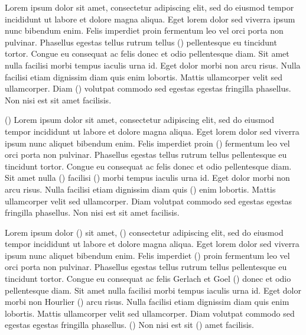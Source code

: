 \documentclass[
]{article}
\begin{document}
Lorem ipsum dolor sit amet, consectetur adipiscing elit, sed do eiusmod
tempor incididunt ut labore et dolore magna aliqua. Eget lorem dolor sed
viverra ipsum nunc bibendum enim. Felis imperdiet proin fermentum leo
vel orci porta non pulvinar. Phasellus egestas tellus rutrum tellus
() pellentesque eu tincidunt tortor. Congue eu consequat ac felis
donec et odio pellentesque diam. Sit amet nulla facilisi morbi tempus
iaculis urna id. Eget dolor morbi non arcu risus. Nulla facilisi etiam
dignissim diam quis enim lobortis. Mattis ullamcorper velit sed
ullamcorper. Diam () volutpat commodo sed egestas egestas fringilla phasellus.
Non nisi est sit amet facilisis.

() Lorem ipsum dolor sit amet, consectetur adipiscing elit,
sed do eiusmod tempor incididunt ut labore et dolore magna aliqua. Eget
lorem dolor sed viverra ipsum nunc aliquet bibendum enim. Felis
imperdiet proin
() fermentum leo vel orci porta non pulvinar. Phasellus
egestas tellus rutrum tellus pellentesque eu tincidunt tortor. Congue eu
consequat ac felis donec et odio pellentesque diam. Sit amet nulla
() facilisi ()
morbi tempus iaculis urna id. Eget dolor morbi non arcu risus. Nulla
facilisi etiam dignissim diam quis
()
enim lobortis. Mattis ullamcorper velit sed ullamcorper. Diam volutpat
commodo sed egestas egestas fringilla phasellus. Non nisi est sit amet
facilisis.

Lorem ipsum dolor
() sit amet,
()
consectetur adipiscing elit, sed do eiusmod tempor incididunt ut labore
et dolore magna aliqua. Eget lorem dolor sed viverra ipsum nunc aliquet
bibendum enim. Felis imperdiet
() proin fermentum leo vel orci porta non pulvinar. Phasellus
egestas tellus rutrum tellus pellentesque eu tincidunt tortor. Congue eu
consequat ac felis Gerlach et Goel
() donec et odio
pellentesque diam. Sit amet nulla facilisi morbi tempus iaculis urna id.
Eget dolor morbi non Hourlier
() arcu
risus. Nulla facilisi etiam dignissim diam quis enim lobortis. Mattis
ullamcorper velit sed ullamcorper. Diam volutpat commodo sed egestas
egestas fringilla phasellus.
() Non nisi est sit
() amet
facilisis.
\end{document}
